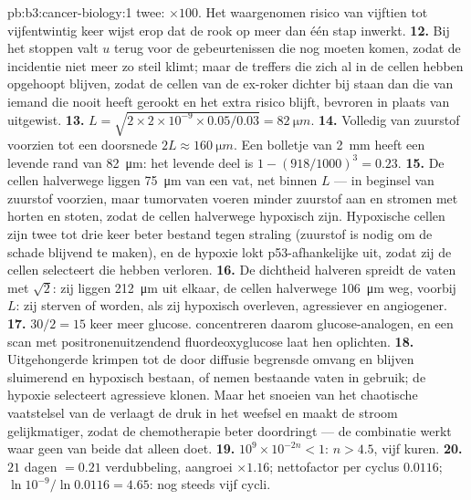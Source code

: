 \begin{solution}{pb:b3:cancer-biology:1}
twee: $\times 100$. Het waargenomen risico van vijftien tot
vijfentwintig keer wijst erop dat de rook op meer dan één stap
inwerkt.
\textbf{12.} Bij het stoppen valt $u$ terug voor de gebeurtenissen die
nog moeten komen, zodat de incidentie niet meer zo steil klimt; maar de
treffers die zich al in de cellen hebben opgehoopt blijven, zodat de
cellen van de ex-roker dichter bij  staan dan die van iemand die
nooit heeft gerookt en het extra risico blijft, bevroren in plaats van
uitgewist.
\textbf{13.} $L = \sqrt{2\times 2\times 10^{-9}\times 0.05/0.03} =
\qty{82}{\micro m}$.
\textbf{14.} Volledig van zuurstof voorzien tot een doorsnede $2L \approx
\qty{160}{\micro m}$. Een bolletje van \qty{2}{mm} heeft een levende
rand van \qty{82}{\micro m}: het levende deel is
$1 - (918/1000)^{3} = 0.23$.
\textbf{15.} De cellen halverwege liggen \qty{75}{\micro m} van een vat,
net binnen $L$ --- in beginsel van zuurstof voorzien, maar tumorvaten
voeren minder zuurstof aan en stromen met horten en stoten, zodat de
cellen halverwege hypoxisch zijn. Hypoxische cellen zijn twee tot drie
keer beter bestand tegen straling (zuurstof is nodig om de schade
blijvend te maken), en de hypoxie lokt p53-afhankelijke  uit,
zodat zij de cellen selecteert die  hebben verloren.
\textbf{16.} De dichtheid halveren spreidt de vaten met $\sqrt{2}$: zij
liggen \qty{212}{\micro m} uit elkaar, de cellen halverwege
\qty{106}{\micro m} weg, voorbij $L$: zij sterven of worden, als zij
hypoxisch overleven, agressiever en angiogener.
\textbf{17.} $30/2 = 15$ keer meer glucose.  concentreren daarom
glucose-analogen, en een scan met positronenuitzendend
fluordeoxyglucose laat hen oplichten.
\textbf{18.} Uitgehongerde  krimpen tot de door diffusie
begrensde omvang en blijven sluimerend en hypoxisch bestaan, of nemen
bestaande vaten in gebruik; de hypoxie selecteert agressieve klonen.
Maar het snoeien van het chaotische vaatstelsel van de  verlaagt de
druk in het weefsel en maakt de stroom gelijkmatiger, zodat de
chemotherapie beter doordringt --- de combinatie werkt waar geen van
beide dat alleen doet.
\textbf{19.} $10^{9}\times 10^{-2n} < 1$: $n > 4.5$, vijf kuren.
\textbf{20.} $21$ dagen $= 0.21$ verdubbeling, aangroei $\times 1.16$;
nettofactor per cyclus $0.0116$; $\ln 10^{-9}/\ln 0.0116 = 4.65$: nog
steeds vijf cycli.

\end{solution}
